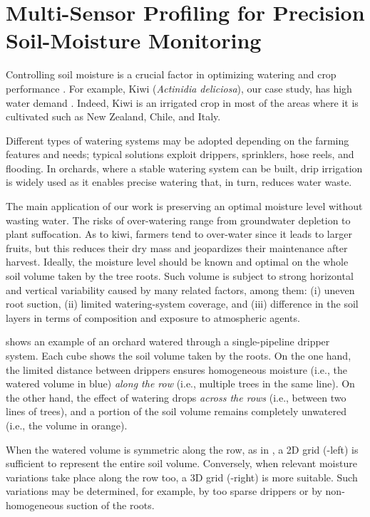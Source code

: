
\chapter{Multi-Sensor Profiling for Precision Soil-Moisture Monitoring}
\label{physics-aware-chap:pluto}

Controlling soil moisture is a crucial factor in optimizing watering and crop performance \cite{turkeltaub2016real}.
For example, Kiwi (\emph{Actinidia deliciosa}), our case study, has high water demand \cite{judd1986water}.
Indeed, Kiwi is an irrigated crop in most of the areas where it is cultivated such as New Zealand, Chile, and Italy.
 
Different types of watering systems may be adopted depending on the farming features and needs; typical solutions exploit drippers, sprinklers, hose reels, and flooding.
In orchards, where a stable watering system can be built, drip irrigation is widely used as it enables precise watering that, in turn, reduces water waste.
 
The main application of our work is preserving an optimal moisture level without wasting water. 
The risks of over-watering range from groundwater depletion to plant suffocation.
As to kiwi, farmers tend to over-water since it leads to larger fruits, but this reduces their dry mass and jeopardizes their maintenance after harvest.
Ideally, the moisture level should be known and optimal on the whole soil volume taken by the tree roots.
Such volume is subject to strong horizontal and vertical variability caused by many related factors, among them: (i) uneven root suction, (ii) limited watering-system coverage, and (iii) difference in the soil layers in terms of composition and exposure to atmospheric agents. %

 shows an example of an orchard watered through a single-pipeline dripper system.
Each cube shows the soil volume taken by the roots.
On the one hand, the limited distance between drippers ensures homogeneous moisture (i.e., the watered volume in blue) \textit{along the row} (i.e., multiple trees in the same line).
On the other hand, the effect of watering drops \textit{across the rows} (i.e., between two lines of trees), and a portion of the soil volume remains completely unwatered (i.e., the volume in orange).

When the watered volume is symmetric along the row, as in , a 2D grid (-left) is sufficient to represent the entire soil volume. Conversely, when relevant moisture variations take place along the row too, a 3D grid (-right) is more suitable. Such variations may be determined, for example, by too sparse drippers or by non-homogeneous suction of the roots.
 
